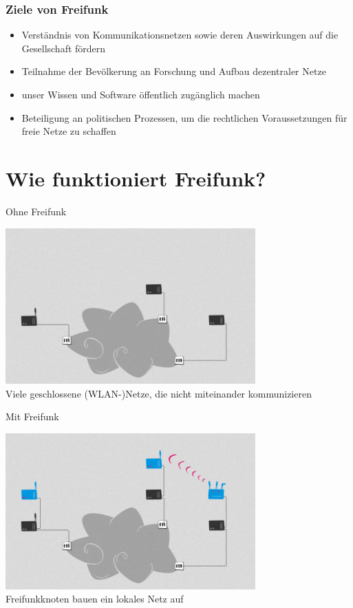 \documentclass[10pt]{beamer}
\begin{document}
\begin{frame}
	\frametitle{Ziele von Freifunk}
	\begin{itemize}[<+->]
		\item Verständnis von Kommunikationsnetzen sowie deren Auswirkungen auf die Gesellschaft fördern
		\item Teilnahme der Bevölkerung an Forschung und Aufbau dezentraler Netze
		\item unser Wissen und Software öffentlich zugänglich machen
		\item Beteiligung an politischen Prozessen, um die rechtlichen Voraussetzungen für freie Netze zu schaffen
	\end{itemize}
\end{frame}

\section{Wie funktioniert Freifunk?}

\begin{frame}{Ohne Freifunk}
	\begin{center}
		\includegraphics[height=6cm]{images/network_1} \\
		\vfill
		Viele geschlossene (WLAN-)Netze, die nicht miteinander kommunizieren
	\end{center}
\end{frame}

\begin{frame}{Mit Freifunk}
	\begin{center}
		\includegraphics[height=6cm]{images/network_2} \\
		\vfill
		Freifunkknoten bauen ein lokales Netz auf
	\end{center}
\end{frame}
\end{document}
